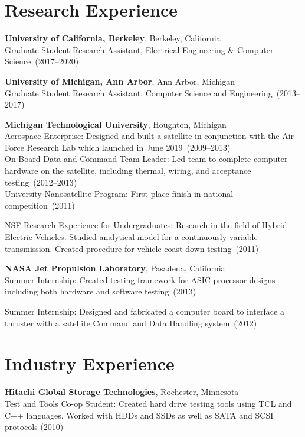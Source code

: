 \documentclass{article}
\begin{document}
\section*{Research Experience}
\vspace{-6pt}

{\bf University of California, Berkeley}, Berkeley, California \\
Graduate Student Research Assistant, Electrical Engineering \& Computer Science~(2017--2020)

{\bf University of Michigan, Ann Arbor}, Ann Arbor, Michigan \\
Graduate Student Research Assistant, Computer Science and Engineering~(2013--2017)

{\bf Michigan Technological University}, Houghton, Michigan \\
Aerospace Enterprise: Designed and built a satellite in conjunction with the
Air Force Research Lab which launched in June 2019~(2009--2013) \\
On-Board Data and Command Team Leader: Led team to complete computer hardware
on the satellite, including thermal, wiring, and acceptance testing~(2012--2013) \\
University Nanosatellite Program: First place finish in national competition~(2011)

NSF Research Experience for Undergraduates: Research in the field of
Hybrid-Electric Vehicles. Studied analytical model for a continuously variable
transmission. Created procedure for vehicle coast-down testing~(2011)


{\bf NASA Jet Propulsion Laboratory}, Pasadena, California \\
Summer Internship: Created testing framework for ASIC processor designs
including both hardware and software testing~(2013)

Summer Internship: Designed and fabricated a computer board to interface a
thruster with a satellite Command and Data Handling system~(2012)



\section*{Industry Experience}
\vspace{-6pt}

{\bf Hitachi Global Storage Technologies}, Rochester, Minnesota \\
Test and Tools Co-op Student: Created hard drive testing tools using TCL and
C++ languages. Worked with HDDs and SSDs as well as SATA and SCSI protocols (2010)
\end{document}
